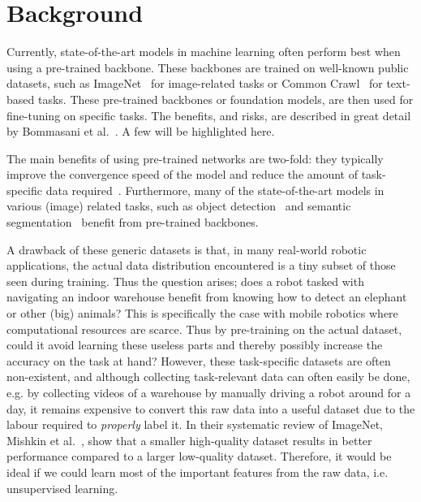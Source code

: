 \chapter{Background}\label{chapter:background}
Currently, state-of-the-art models in machine learning often perform best when using a pre-trained backbone. These backbones are trained on well-known public datasets, such as ImageNet~\cite{deng2009imagenet} for image-related tasks or Common Crawl~\cite{commoncrawl} for text-based tasks. These pre-trained backbones or foundation models, are then used for fine-tuning on specific tasks. The benefits, and risks, are described in great detail by Bommasani et al.~\cite{DBLP:journals/corr/abs-2108-07258}. A few will be highlighted here.

The main benefits of using pre-trained networks are two-fold: they typically improve the convergence speed of the model and reduce the amount of task-specific data required~\cite{donahue2014decaf,zeiler2014visualizing}. Furthermore, many of the state-of-the-art models in various (image) related tasks, such as object detection~\cite{liu2016ssd,redmon2016you} and semantic segmentation~\cite{orsic2019defense,girshick2014rich} benefit from pre-trained backbones.

A drawback of these generic datasets is that, in many real-world robotic applications, the actual data distribution encountered is a tiny subset of those seen during training. Thus the question arises; does a robot tasked with navigating an indoor warehouse benefit from knowing how to detect an elephant or other (big) animals? This is specifically the case with mobile robotics where computational resources are scarce. Thus by pre-training on the actual dataset, could it avoid learning these useless parts and thereby possibly increase the accuracy on the task at hand? However, these task-specific datasets are often non-existent, and although collecting task-relevant data can often easily be done, e.g. by collecting videos of a warehouse by manually driving a robot around for a day, it remains expensive to convert this raw data into a useful dataset due to the labour required to \emph{properly} label it.
In their systematic review of ImageNet, Mishkin et al.~\cite{MISHKIN201711}, show that a smaller high-quality dataset results in better performance compared to a larger low-quality dataset. Therefore, it would be ideal if we could learn most of the important features from the raw data, i.e. unsupervised learning.

